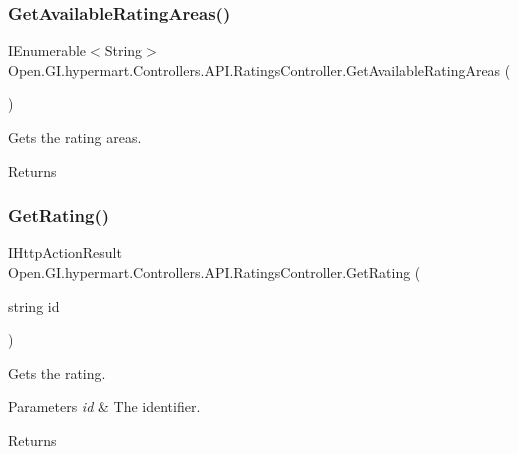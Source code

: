 \subsubsection{\texorpdfstring{Get\+Available\+Rating\+Areas()}{GetAvailableRatingAreas()}}
{\footnotesize\ttfamily I\+Enumerable$<$String$>$ Open.\+G\+I.\+hypermart.\+Controllers.\+A\+P\+I.\+Ratings\+Controller.\+Get\+Available\+Rating\+Areas (\begin{DoxyParamCaption}{ }\end{DoxyParamCaption})}



Gets the rating areas. 

\begin{DoxyReturn}{Returns}

\end{DoxyReturn}
\hypertarget{class_open_1_1_g_i_1_1hypermart_1_1_controllers_1_1_a_p_i_1_1_ratings_controller_a79b77391187930a8c148fd4c3ae8e2f0}{}\label{class_open_1_1_g_i_1_1hypermart_1_1_controllers_1_1_a_p_i_1_1_ratings_controller_a79b77391187930a8c148fd4c3ae8e2f0} 
\subsubsection{\texorpdfstring{Get\+Rating()}{GetRating()}}
{\footnotesize\ttfamily I\+Http\+Action\+Result Open.\+G\+I.\+hypermart.\+Controllers.\+A\+P\+I.\+Ratings\+Controller.\+Get\+Rating (\begin{DoxyParamCaption}\item[{string}]{id }\end{DoxyParamCaption})}



Gets the rating. 


\begin{DoxyParams}{Parameters}
{\em id} & The identifier.\\
\hline
\end{DoxyParams}
\begin{DoxyReturn}{Returns}

\end{DoxyReturn}
\hypertarget{class_open_1_1_g_i_1_1hypermart_1_1_controllers_1_1_a_p_i_1_1_ratings_controller_aa3ff04acf50d3bf4765f462c7fbdaf2b}{}\label{class_open_1_1_g_i_1_1hypermart_1_1_controllers_1_1_a_p_i_1_1_ratings_controller_aa3ff04acf50d3bf4765f462c7fbdaf2b} 
